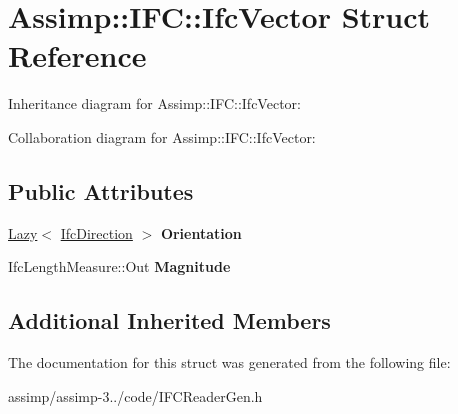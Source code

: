 \hypertarget{struct_assimp_1_1_i_f_c_1_1_ifc_vector}{\section{Assimp\+:\+:I\+F\+C\+:\+:Ifc\+Vector Struct Reference}
\label{struct_assimp_1_1_i_f_c_1_1_ifc_vector}
}


Inheritance diagram for Assimp\+:\+:I\+F\+C\+:\+:Ifc\+Vector\+:


Collaboration diagram for Assimp\+:\+:I\+F\+C\+:\+:Ifc\+Vector\+:
\subsection*{Public Attributes}
\begin{DoxyCompactItemize}
\item 
\hypertarget{struct_assimp_1_1_i_f_c_1_1_ifc_vector_ad31667f24a50f7bd56e9844e70b1cd87}{\hyperlink{struct_assimp_1_1_s_t_e_p_1_1_lazy}{Lazy}$<$ \hyperlink{struct_assimp_1_1_i_f_c_1_1_ifc_direction}{Ifc\+Direction} $>$ {\bfseries Orientation}}\label{struct_assimp_1_1_i_f_c_1_1_ifc_vector_ad31667f24a50f7bd56e9844e70b1cd87}

\item 
\hypertarget{struct_assimp_1_1_i_f_c_1_1_ifc_vector_a8f232e3ab93fcd8a414f3bf198b5db76}{Ifc\+Length\+Measure\+::\+Out {\bfseries Magnitude}}\label{struct_assimp_1_1_i_f_c_1_1_ifc_vector_a8f232e3ab93fcd8a414f3bf198b5db76}

\end{DoxyCompactItemize}
\subsection*{Additional Inherited Members}


The documentation for this struct was generated from the following file\+:\begin{DoxyCompactItemize}
\item 
assimp/assimp-\/3../code/I\+F\+C\+Reader\+Gen.\+h\end{DoxyCompactItemize}
